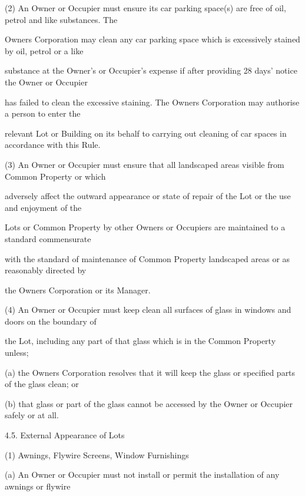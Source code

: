 \documentclass{article}
\begin{document}
{\fontsize{9.962}{1}(2) An Owner or Occupier must ensure its car parking space(s) are free of oil, petrol and like substances. The }

{\fontsize{10.02}{1}Owners Corporation may clean any car parking space which is excessively stained by oil, petrol or a like }

{\fontsize{10.02}{1}substance at the Owner's or Occupier's expense if after providing 28 days’ notice the Owner or Occupier }

{\fontsize{10.02}{1}has failed to clean the excessive staining. The Owners Corporation may authorise a person to enter the }

{\fontsize{10.02}{1}relevant Lot or Building on its behalf to carrying out cleaning of car spaces in accordance with this Rule. }


{\fontsize{9.962}{1}(3) An Owner or Occupier must ensure that all landscaped areas visible from Common Property or which }

{\fontsize{10.02}{1}adversely affect the outward appearance or state of repair of the Lot or the use and enjoyment of the }

{\fontsize{10.02}{1}Lots or Common Property by other Owners or Occupiers are maintained to a standard commensurate }

{\fontsize{10.02}{1}with the standard of maintenance of Common Property landscaped areas or as reasonably directed by }

{\fontsize{10.02}{1}the Owners Corporation or its Manager. }

{\fontsize{9.962}{1}(4) An Owner or Occupier must keep clean all surfaces of glass in windows and doors on the boundary of }

{\fontsize{10.02}{1}the Lot, including any part of that glass which is in the Common Property unless; }

{\fontsize{9.962}{1}(a) the Owners Corporation resolves that it will keep the glass or specified parts of the glass clean; or }

{\fontsize{9.962}{1}(b) that glass or part of the glass cannot be accessed by the Owner or Occupier safely or at all. }

{\fontsize{9.99}{1}4.5. External Appearance of Lots }

{\fontsize{9.962}{1}(1) Awnings, Flywire Screens, Window Furnishings }

{\fontsize{9.962}{1}(a) An Owner or Occupier must not install or permit the installation of any awnings or flywire }
\end{document}
